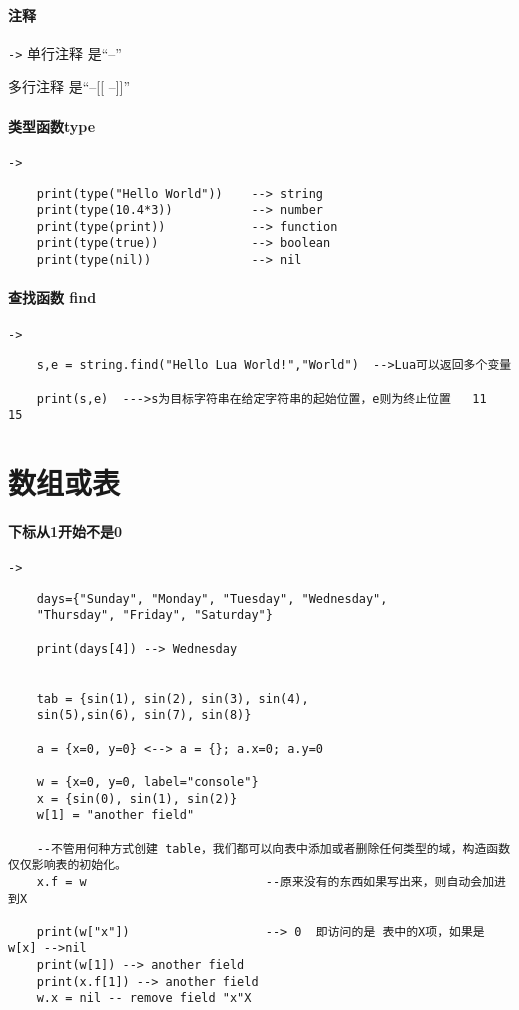 \documentclass[UTF8,a4paper,12pt]{ctexart}
\begin{document}
	 \paragraph{注释}\verb|->|
		 单行注释 是“--”
		 
		 多行注释 是“--[[      --]]”
		 
	 \paragraph{类型函数type}\verb|->|
		   \begin{lstlisting}
	print(type("Hello World"))    --> string
	print(type(10.4*3))           --> number
	print(type(print))            --> function
	print(type(true))             --> boolean
	print(type(nil))              --> nil
		   \end{lstlisting}
	\paragraph{查找函数 find}\verb|->|
		 \begin{lstlisting}
	s,e = string.find("Hello Lua World!","World")  -->Lua可以返回多个变量
				 
	print(s,e)  --->s为目标字符串在给定字符串的起始位置，e则为终止位置   11  15
		 \end{lstlisting}
\newpage
\section{数组或表}
	\paragraph{下标从1开始不是0}\verb|->|
			\begin{lstlisting}
	days={"Sunday", "Monday", "Tuesday", "Wednesday",
	"Thursday", "Friday", "Saturday"}
	
	print(days[4]) --> Wednesday
	
	
	tab = {sin(1), sin(2), sin(3), sin(4),
	sin(5),sin(6), sin(7), sin(8)}
	
	a = {x=0, y=0} <--> a = {}; a.x=0; a.y=0
	
	w = {x=0, y=0, label="console"}
	x = {sin(0), sin(1), sin(2)}
	w[1] = "another field"
	
	--不管用何种方式创建 table，我们都可以向表中添加或者删除任何类型的域，构造函数仅仅影响表的初始化。
	x.f = w							--原来没有的东西如果写出来，则自动会加进到X
	
	print(w["x"]) 				    --> 0  即访问的是 表中的X项，如果是w[x] -->nil
	print(w[1]) --> another field
	print(x.f[1]) --> another field
	w.x = nil -- remove field "x"X
			\end{lstlisting}
\end{document}
